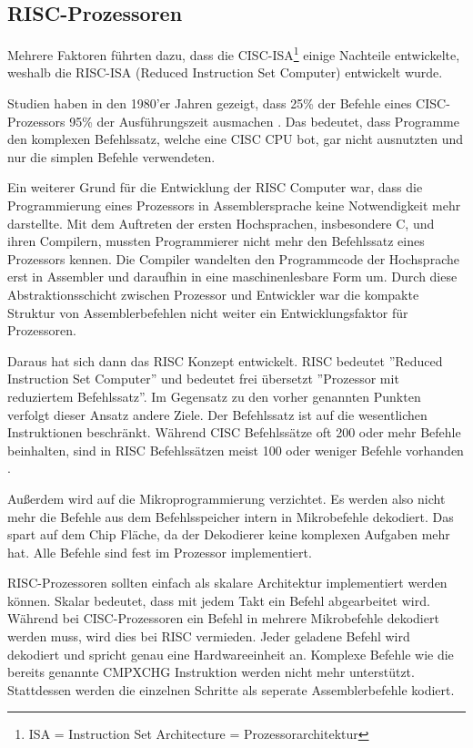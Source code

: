 \documentclass[12pt]{article}
\begin{document}
\subsection{RISC-Prozessoren}
Mehrere Faktoren führten dazu, dass die CISC-ISA\footnote{ISA = Instruction Set Architecture = Prozessorarchitektur} einige Nachteile entwickelte, weshalb die RISC-ISA (Reduced Instruction Set Computer) entwickelt wurde.

\par \bigskip
\noindent Studien haben in den 1980'er Jahren gezeigt, dass 25\% der Befehle eines CISC-Prozessors 95\% der Ausführungszeit ausmachen \cite{jamil1995risc}. Das bedeutet, dass Programme den komplexen Befehlssatz, welche eine CISC CPU bot, gar nicht ausnutzten und nur die simplen Befehle verwendeten. \cite{patterson1985reduced} 

\par \bigskip
\noindent Ein weiterer Grund für die Entwicklung der RISC Computer war, dass die Programmierung eines Prozessors in Assemblersprache keine Notwendigkeit mehr darstellte. Mit dem Auftreten der ersten Hochsprachen, insbesondere C, und ihren Compilern, mussten Programmierer nicht mehr den Befehlssatz eines Prozessors kennen. Die Compiler wandelten den Programmcode der Hochsprache erst in Assembler und daraufhin in eine maschinenlesbare Form um. Durch diese Abstraktionsschicht zwischen Prozessor und Entwickler war die kompakte Struktur von Assemblerbefehlen nicht weiter ein Entwicklungsfaktor für Prozessoren.

\par \bigskip
\noindent Daraus hat sich dann das RISC Konzept entwickelt. RISC bedeutet ''Reduced Instruction Set Computer'' und bedeutet frei übersetzt ''Prozessor mit reduziertem Befehlssatz''. Im Gegensatz zu den vorher genannten Punkten verfolgt dieser Ansatz andere Ziele. Der Befehlssatz ist auf die wesentlichen Instruktionen beschränkt. Während CISC Befehlssätze oft 200 oder mehr Befehle beinhalten, sind in RISC Befehlssätzen meist 100 oder weniger Befehle vorhanden \cite[S. 85]{TaschenbuchMikroprozessortechnik}.
\par \bigskip
\noindent Außerdem wird auf die Mikroprogrammierung verzichtet. Es werden also nicht mehr die Befehle aus dem Befehlsspeicher intern in Mikrobefehle dekodiert. Das spart auf dem Chip Fläche, da der Dekodierer keine komplexen Aufgaben mehr hat. Alle Befehle sind fest im Prozessor implementiert.
\par \bigskip
\noindent RISC-Prozessoren sollten einfach als skalare Architektur implementiert werden können. Skalar bedeutet, dass mit jedem Takt ein Befehl abgearbeitet wird. Während bei CISC-Prozessoren ein Befehl in mehrere Mikrobefehle dekodiert werden muss, wird dies bei RISC vermieden. Jeder geladene Befehl wird dekodiert und spricht genau eine Hardwareeinheit an. Komplexe Befehle wie die bereits genannte CMPXCHG Instruktion werden nicht mehr unterstützt. Stattdessen werden die einzelnen Schritte als seperate Assemblerbefehle kodiert. 
\end{document}
